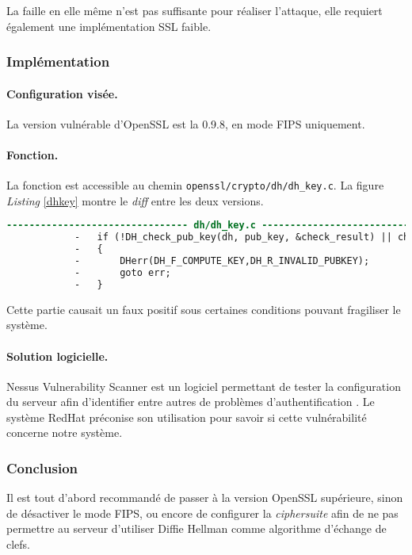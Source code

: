 		La faille en elle même n'est pas suffisante pour réaliser l'attaque, elle requiert également une implémentation SSL faible. 
	
		\subsubsection{Implémentation}
		
			\paragraph{Configuration visée.\\}
		
			La version vulnérable d'OpenSSL est la 0.9.8, en mode FIPS uniquement.

			\paragraph{Fonction.\\}

			La fonction est accessible au chemin \texttt{openssl/crypto/dh/dh\_key.c}. La figure \textit{Listing} \ref{dhkey} montre le \textit{diff} entre les deux versions.

			\begin{lstlisting}[language=diff,caption=dh\_key.c, label=dhkey]
			-------------------------------- dh/dh_key.c --------------------------------
			-	if (!DH_check_pub_key(dh, pub_key, &check_result) || check_result)
			-	{
			-		DHerr(DH_F_COMPUTE_KEY,DH_R_INVALID_PUBKEY);
			-		goto err;
			-	}
			\end{lstlisting}

			Cette partie causait un faux positif sous certaines conditions pouvant fragiliser le système.

			\paragraph{Solution logicielle.\\}

			Nessus Vulnerability Scanner est un logiciel permettant de tester la configuration du serveur afin d'identifier entre autres de problèmes d'authentification \cite{nessus}. Le système RedHat préconise son utilisation pour savoir si cette vulnérabilité concerne notre système.
		
	\subsubsection{Conclusion}

		Il est tout d'abord recommandé de passer à la version OpenSSL supérieure, sinon de désactiver le mode FIPS, ou encore de configurer la \textit{ciphersuite} afin de ne pas permettre au serveur d'utiliser Diffie Hellman comme algorithme d'échange de clefs.
